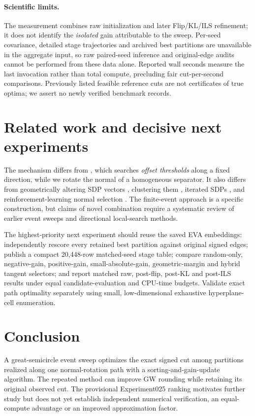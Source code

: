 \documentclass[10pt,letterpaper]{article}
\begin{document}
\paragraph{Scientific limits.}
The measurement combines raw initialization and later Flip/KL/ILS refinement; it does not identify the \emph{isolated} gain attributable to the sweep. Per-seed covariance, detailed stage trajectories and archived best partitions are unavailable in the aggregate input, so raw paired-seed inference and original-edge audits cannot be performed from these data alone. Reported wall seconds measure the last invocation rather than total compute, precluding fair cut-per-second comparisons. Previously listed feasible reference cuts are not certificates of true optima; we assert no newly verified benchmark records.

\section{Related work and decisive next experiments}
The mechanism differs from \citet{lang2004}, which searches \emph{offset thresholds} along a fixed direction, while we rotate the normal of a homogeneous separator. It also differs from geometrically altering SDP vectors \citep{zwick1999,feige2006}, clustering them \citep{rodriguez2020}, iterated SDPs \citep{felzenszwalb2022}, and reinforcement-learning normal selection \citep{maliakal2025}. The finite-event approach is a specific construction, but claims of novel combination require a systematic review of earlier event sweeps and directional local-search methods.

The highest-priority next experiment should reuse the saved EVA embeddings: independently rescore every retained best partition against original signed edges; publish a compact 20,448-row matched-seed stage table; compare random-only, negative-gain, positive-gain, small-absolute-gain, geometric-margin and hybrid tangent selectors; and report matched raw, post-flip, post-KL and post-ILS results under equal candidate-evaluation and CPU-time budgets. Validate exact path optimality separately using small, low-dimensional exhaustive hyperplane-cell enumeration.

\section{Conclusion}
A great-semicircle event sweep optimizes the exact signed cut among partitions realized along one normal-rotation path with a sorting-and-gain-update algorithm. The repeated method can improve GW rounding while retaining its original observed cut. The provisional Experiment025 ranking motivates further study but does not yet establish independent numerical verification, an equal-compute advantage or an improved approximation factor.
\end{document}
